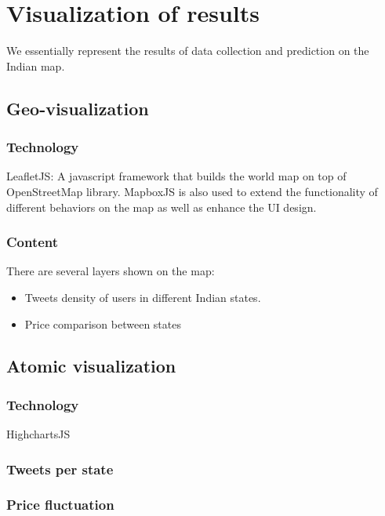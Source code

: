\section*{Visualization of results}

We essentially represent the results of data collection and prediction on the Indian map. 

\subsection*{Geo-visualization}

\subsubsection*{Technology}
LeafletJS: A javascript framework that builds the world map on top of OpenStreetMap library. MapboxJS is also used to extend the functionality of different behaviors on the map as well as enhance the UI design.

\subsubsection*{Content}
There are several layers shown on the map:\\
\begin{itemize}
\item Tweets density of users in different Indian states.
\item Price comparison between states\\
\end{itemize}

\subsection*{Atomic visualization}
\subsubsection*{Technology}
HighchartsJS

\subsubsection*{Tweets per state}


\subsubsection*{Price fluctuation}

